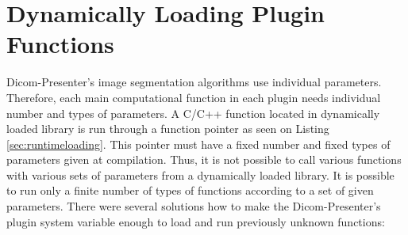 


\section{Dynamically Loading Plugin Functions}

Dicom-Presenter's image segmentation algorithms use individual parameters. Therefore, each main computational function in each plugin needs individual number and types of parameters. A C/C++ function located in dynamically loaded library is run through a function pointer as seen on Listing \ref{sec:runtimeloading}. This pointer must have a fixed number and fixed types of parameters given at compilation. Thus, it is not possible to call various functions with various sets of parameters from a dynamically loaded library. It is possible to run only a finite number of types of functions according to a set of given parameters. There were several solutions how to make the Dicom-Presenter's plugin system variable enough to load and run previously unknown functions:

